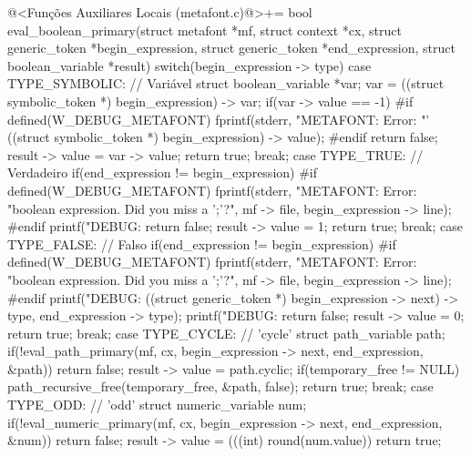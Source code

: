 {\iniciocodigo
@<Funções Auxiliares Locais (metafont.c)@>+=
bool eval_boolean_primary(struct metafont *mf, struct context *cx,
                          struct generic_token *begin_expression,
                          struct generic_token *end_expression,
                          struct boolean_variable *result){
  switch(begin_expression -> type){
    case TYPE_SYMBOLIC: // Variável
      struct boolean_variable *var;
      var = ((struct symbolic_token *) begin_expression) -> var;
      if(var -> value == -1){
#if defined(W_DEBUG_METAFONT)
        fprintf(stderr, "METAFONT: Error: %
                "'%
                ((struct symbolic_token *) begin_expression) -> value);
#endif
        return false;
      }
      result -> value = var -> value;
      return true;
    break;
    case TYPE_TRUE: // Verdadeiro
      if(end_expression != begin_expression){
#if defined(W_DEBUG_METAFONT)
        fprintf(stderr, "METAFONT: Error: %
                "boolean expression. Did you miss a ';'?\n",
                mf -> file, begin_expression -> line);
#endif
        printf("DEBUG: %
        return false;
      }
      result -> value = 1;
      return true;
    break;
    case TYPE_FALSE: // Falso
      if(end_expression != begin_expression){
#if defined(W_DEBUG_METAFONT)
        fprintf(stderr, "METAFONT: Error: %
                "boolean expression. Did you miss a ';'?\n",
                mf -> file, begin_expression -> line);
#endif
        printf("DEBUG: %
               ((struct generic_token *) begin_expression -> next) -> type,
               end_expression -> type);
        printf("DEBUG: %
        return false;
      }
      result -> value = 0;
      return true;
    break;
    case TYPE_CYCLE: // 'cycle'
      struct path_variable path;
      if(!eval_path_primary(mf, cx, begin_expression -> next, end_expression,
                            &path))
        return false;
      result -> value = path.cyclic;
      if(temporary_free != NULL)
        path_recursive_free(temporary_free, &path, false);
      return true;
    break;
    case TYPE_ODD: // 'odd'
      struct numeric_variable num;
      if(!eval_numeric_primary(mf, cx, begin_expression -> next, end_expression,
                               &num))
        return false;
      result -> value = (((int) round(num.value)) %
      return true;
}}}
